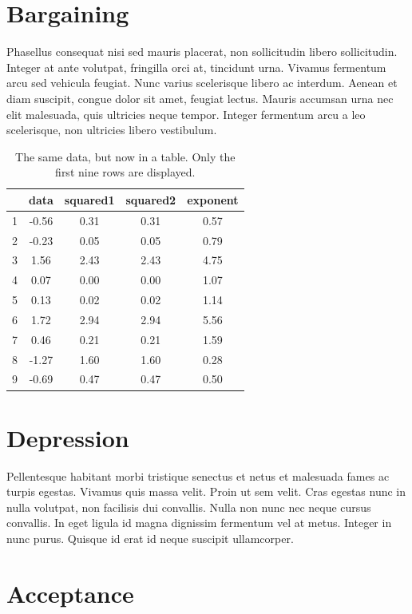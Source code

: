 \documentclass[10pt, fullpage, a4paper, titlepage]{article}
\begin{document}
\section{Bargaining}

Phasellus consequat nisi sed mauris placerat, non sollicitudin libero sollicitudin. Integer at ante volutpat, fringilla orci at, tincidunt urna. Vivamus fermentum arcu sed vehicula feugiat. Nunc varius scelerisque libero ac interdum. Aenean et diam suscipit, congue dolor sit amet, feugiat lectus. Mauris accumsan urna nec elit malesuada, quis ultricies neque tempor. Integer fermentum arcu a leo scelerisque, non ultricies libero vestibulum.

\begin{table}[!hb]
\centering
\caption{The same data, but now in a table. Only the first nine rows are displayed.}
\begin{tabular}{lcccc}
\toprule
 & data & squared1 & squared2 & exponent \\
 \midrule
1 & -0.56 & 0.31 & 0.31 & 0.57 \\
2 & -0.23 & 0.05 & 0.05 & 0.79 \\
3 & 1.56 & 2.43 & 2.43 & 4.75 \\
4 & 0.07 & 0.00 & 0.00 & 1.07 \\
5 & 0.13 & 0.02 & 0.02 & 1.14 \\
6 & 1.72 & 2.94 & 2.94 & 5.56 \\
7 & 0.46 & 0.21 & 0.21 & 1.59 \\
8 & -1.27 & 1.60 & 1.60 & 0.28 \\
9 & -0.69 & 0.47 & 0.47 & 0.50 \\
\bottomrule
\end{tabular}
\end{table}

\section{Depression}

Pellentesque habitant morbi tristique senectus et netus et malesuada fames ac turpis egestas. Vivamus quis massa velit. Proin ut sem velit. Cras egestas nunc in nulla volutpat, non facilisis dui convallis. Nulla non nunc nec neque cursus convallis. In eget ligula id magna dignissim fermentum vel at metus. Integer in nunc purus. Quisque id erat id neque suscipit ullamcorper.

\section{Acceptance}
\end{document}
